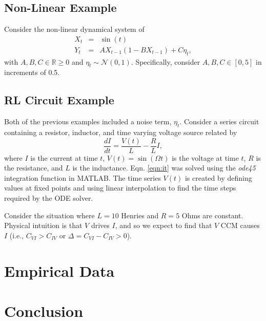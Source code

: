 \documentclass[a4paper,11pt,twocolumn]{article}
\begin{document}
\subsection{Non-Linear Example}
Consider the non-linear dynamical system of
\begin{eqnarray}
\label{eqn:nonlinearEX}
X_t &=& \sin(t)\\
Y_t &=& AX_{t-1}\left(1-BX_{t-1}\right)+C\eta_t,
\end{eqnarray}
with $A,B,C\in\mathbb{R}\ge 0$ and $\eta_t\sim\mathcal{N}\left(0,1\right)$.  Specifically, consider $A,B,C\in[0,5]$ in increments of 0.5.  

\subsection{RL Circuit Example}
\label{sec:rlcirc}
Both of the previous examples included a noise term, $\eta_t$.  Consider a series circuit containing a resistor, inductor, and time varying voltage source related by
\begin{equation}
\label{eqn:it}
\frac{dI}{dt} = \frac{V(t)}{L} - \frac{R}{L} I,
\end{equation}
where $I$ is the current at time $t$, $V(t)= \sin\left(\Omega t\right)$ is the voltage at time $t$, $R$ is the resistance, and $L$ is the inductance.  Eqn. \ref{eqn:it} was solved using the {\em ode45} integration function in MATLAB.  The time series $V(t)$ is created by defining values at fixed points and using linear interpolation to find the time steps required by the ODE solver.  

Consider the situation where $L=10$ Henries and $R=5$ Ohms are constant.  Physical intuition is that $V$ drives $I$, and so we expect to find that $V$ CCM causes $I$ (i.e., $C_{VI}>C_{IV}$ or $\Delta = C_{VI}-C_{IV} > 0$). 


\section{Empirical Data}

\section{Conclusion}

%
%
\end{document}
